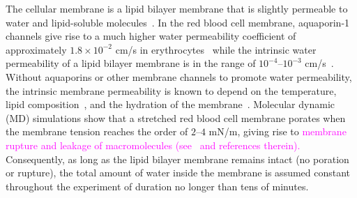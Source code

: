 \documentclass[prb,preprint,showpacs,preprintnumbers,amsmath,amssymb,longbibliography]{revtex4-1}
\begin{document}
The cellular membrane is a lipid bilayer membrane that is slightly permeable to water and lipid-soluble
molecules~\cite{Dick1964_JTB, FettiplaceHaydon1980_PhysRev,
DeamerBramhall1986_ChemPhysLipids, Grafmueller2019_ABLS}. 
%
%
In the red blood cell membrane, aquaporin-1 channels give rise to a much
higher water permeability coefficient of approximately $1.8\times 10^{-2}$ cm/s in
erythrocytes~\cite{YangMaVerkman2001_JBC} while the intrinsic water
permeability of a lipid bilayer membrane is in the range of
$10^{-4}$--$10^{-3}$ cm/s~\cite{ThompsonHuang1966_ANYAS,
FettiplaceHaydon1980_PhysRev, Grafmueller2019_ABLS, Dimova2020_GVB,
BhatiaRobinsonDimova2020_SoftMatt}. 
Without aquaporins or other membrane channels to promote water
permeability, the intrinsic membrane permeability is known to depend on the
temperature, lipid composition~\cite{OlbrichRawiczNeedhamEtAl2000_BJ},
and the hydration of the membrane~\cite{MarrinkBerendsen1994_JPhysChem}.
%
Molecular dynamic (MD) simulations show that a stretched red blood cell
membrane porates when the membrane tension reaches the order of $2$--$4$
mN/m,
giving rise to \textcolor{magenta}{membrane rupture and leakage of macromolecules (see~\citet{RazizadehNikfarPaulLiu2020_BJ} and references therein).}
%
%
Consequently, as long as the lipid bilayer membrane
remains intact (no poration or rupture), the total amount of water inside the membrane 
is assumed constant throughout the experiment of duration
no longer than tens of minutes.
%
\end{document}
